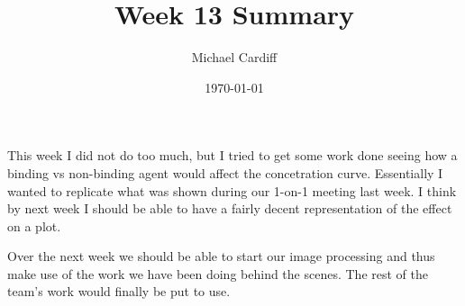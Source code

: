 \documentclass[12pt]{article}
\title{\vspace{-3em}Week 13 Summary}
\author{Michael Cardiff}
\date{\today}
\begin{document}
\maketitle
This week I did not do too much, but I tried to get some work done seeing how a binding vs non-binding agent would affect the concetration curve. Essentially I wanted to replicate what was shown during our 1-on-1 meeting last week. I think by next week I should be able to have a fairly decent representation of the effect on a plot.

Over the next week we should be able to start our image processing and thus make use of the work we have been doing behind the scenes. The rest of the team's work would finally be put to use. 
\end{document}
